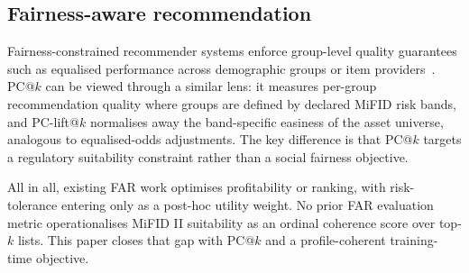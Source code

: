 \subsection{Fairness-aware recommendation}
Fairness-constrained recommender systems enforce group-level quality guarantees such as equalised performance across demographic groups or item providers~\cite{zhao2024fairnessdiversityrecommendersystems}. PC@$k$ can be viewed through a similar lens: it measures per-group recommendation quality where groups are defined by declared MiFID risk bands, and PC-lift@$k$ normalises away the band-specific easiness of the asset universe, analogous to equalised-odds adjustments. The key difference is that PC@$k$ targets a regulatory suitability constraint rather than a social fairness objective.

All in all, existing FAR work optimises profitability or ranking, with risk-tolerance entering only as a post-hoc utility weight. No prior FAR evaluation metric operationalises MiFID II suitability as an ordinal coherence score over top-$k$ lists. This paper closes that gap with PC@$k$ and a profile-coherent training-time objective.

